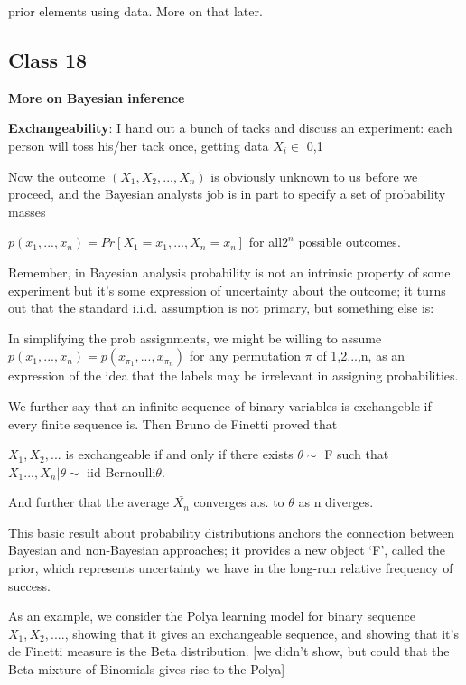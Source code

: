 \documentclass[11pt,a4paper]{article}
\begin{document}
	prior elements using data.   More on that later.
	
	\subsection*{Class 18}
	
	
	\textbf{More on Bayesian inference}
	
	\textbf{Exchangeability}:  I hand out a bunch of tacks and discuss an experiment: each person will toss his/her tack once, getting data $X_i \in$ {0,1}
	
	Now the outcome $(X_1, X_2,...,X_n)$ is obviously unknown to us before we proceed, and the Bayesian analysts job is in part to specify a set of probability masses
	
	$p(x_1, ..., x_n ) = Pr[ X_1=x_1, ..., X_n = x_n ] $  for all$ 2^n$ possible outcomes.
	
	Remember, in Bayesian analysis probability is not an intrinsic property of some experiment but it's some expression of uncertainty about the outcome; it turns out that the standard i.i.d. assumption is not primary, but something else is:
	
	In simplifying the prob assignments, we might be willing to assume  $p(x_1,...,x_n) = p( x_{\pi_1}, ..., x_{\pi_n} )$ for any permutation $\pi$ of {1,2...,n}, as an expression of the idea that the labels may be irrelevant in assigning probabilities.
	
	We further say that an infinite sequence of binary variables is exchangeble if every finite sequence is.  Then Bruno de Finetti proved that
	
	$X_1, X_2, ...$ is exchangeable if and only if there exists $\theta \sim$ F such that $X_1...,X_n | \theta \sim$ iid Bernoulli{$\theta$}.
	
	And further that the average $\bar{X_n}$ converges a.s. to $\theta$ as n diverges.
	
	This basic result about probability distributions anchors the connection between Bayesian and non-Bayesian approaches; it provides a new object `F', called the prior, which represents uncertainty we have in the long-run relative frequency of success.
	
	As an example, we consider the Polya learning model for binary sequence $X_1, X_2, .... $, showing that it gives an exchangeable sequence, and showing that it's de Finetti measure is the Beta distribution. [we didn't show, but could that the Beta mixture of Binomials gives rise to the Polya]
	
\end{document}
